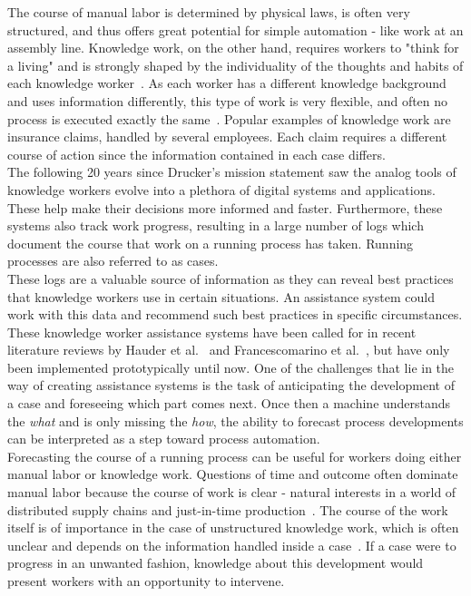 The course of manual labor is determined by physical laws, is often very structured, and thus offers great potential for simple automation - like work at an assembly line. Knowledge work, on the other hand, requires workers to "think for a living" and is strongly shaped by the individuality of the thoughts and habits of each knowledge worker~\cite{drucker1999}. As each worker has a different knowledge background and uses information differently, this type of work is very flexible, and often no process is executed exactly the same~\cite{hewelt2016}. Popular examples of knowledge work are insurance claims, handled by several employees. Each claim requires a different course of action since the information contained in each case differs.\\

The following 20 years since Drucker's mission statement saw the analog tools of knowledge workers evolve into a plethora of digital systems and applications. These help make their decisions more informed and faster. Furthermore, these systems also track work progress, resulting in a large number of logs which document the course that work on a running process has taken. Running processes are also referred to as cases.\\

These logs are a valuable source of information as they can reveal best practices that knowledge workers use in certain situations. An assistance system could work with this data and recommend such best practices in specific circumstances. These knowledge worker assistance systems have been called for in recent literature reviews by Hauder et al.~\cite{hauder2014} and Francescomarino et al.~\cite{francescomarino2018}, but have only been implemented prototypically until now. One of the challenges that lie in the way of creating assistance systems is the task of anticipating the development of a case and foreseeing which part comes next. Once then a machine understands the \textit{what} and is only missing the \textit{how}, the ability to forecast process developments can be interpreted as a step toward process automation.\\

Forecasting the course of a running process can be useful for workers doing either manual labor or knowledge work. Questions of time and outcome often dominate manual labor because the course of work is clear - natural interests in a world of distributed supply chains and just-in-time production~\cite{web:economist:jit}. The course of the work itself is of importance in the case of unstructured knowledge work, which is often unclear and depends on the information handled inside a case~\cite{francescomarino2015}. If a case were to progress in an unwanted fashion, knowledge about this development would present workers with an opportunity to intervene.\\

